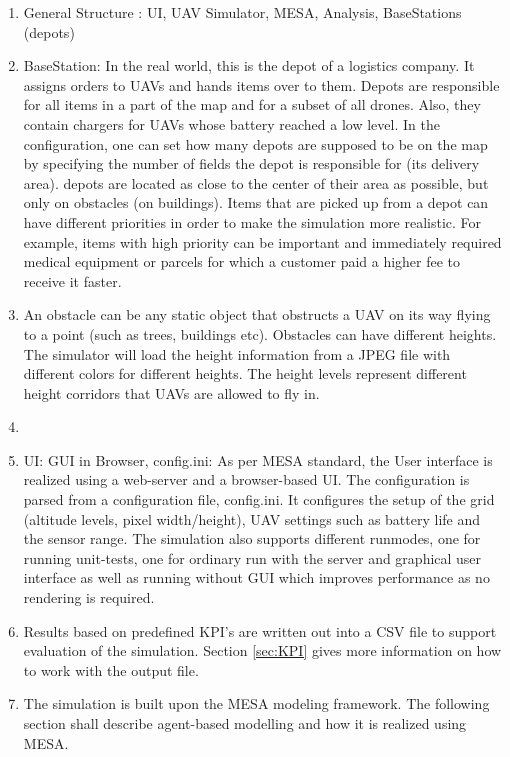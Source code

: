 \begin{enumerate}
	\item General Structure :  UI, UAV Simulator, MESA, Analysis, BaseStations (depots)
	\item BaseStation: In the real world, this is the depot of a logistics company. It assigns orders to UAVs and hands items over to them. Depots are responsible for all items in a part of the map and for a subset of all drones. Also, they contain chargers for UAVs whose battery reached a low level. In the configuration, one can set how many depots are supposed to be on the map by specifying the number of fields the depot is responsible for (its delivery area). depots are located as close to the center of their area as possible, but only on obstacles (on buildings). Items that are picked up from a depot can have different priorities in order to make the simulation more realistic. For example, items with high priority can be important and immediately required medical equipment or parcels for which a customer paid a higher fee to receive it faster.
		\item An obstacle can be any static object that obstructs a UAV on its way flying to a point (such as trees, buildings etc). Obstacles can have different heights. The simulator will load the height information from a JPEG file with different colors for different heights. The height levels represent different height corridors that UAVs are allowed to fly in.
	\item 
	\item UI: GUI in Browser, config.ini: As per MESA standard, the User interface is realized using a web-server and a browser-based UI. The configuration is parsed from a configuration file,  config.ini. It configures the setup of the grid (altitude levels, pixel width/height), UAV settings such as battery life and the sensor range. The simulation also supports different runmodes, one for running unit-tests, one for ordinary run with the server and graphical user interface as well as running without GUI which improves performance as no rendering is required.
		\item Results based on predefined KPI's are written out into a CSV file to support evaluation of the simulation. Section \ref{sec:KPI} gives more information on how to work with the output file.
	\item The simulation is built upon the MESA modeling framework. The following section shall describe agent-based modelling and how it is realized using MESA.

\end{enumerate}

